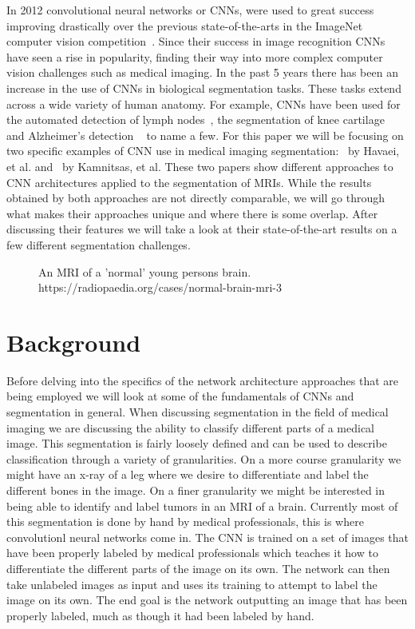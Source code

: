 \documentclass{sig-alternate}
\begin{document}
In 2012 convolutional neural networks or CNNs, were used to great success improving drastically over the previous state-of-the-arts in the ImageNet computer vision competition~\cite{NIPS:2012}. Since their success in image recognition CNNs have seen a rise in popularity, finding their way into more complex computer vision challenges such as medical imaging. In the past 5 years there has been an increase in the use of CNNs in biological segmentation tasks. These tasks extend across a wide variety of human anatomy. For example, CNNs have been used for the automated detection of lymph nodes~\cite{Roth:2014}, the segmentation of knee cartilage~\cite{Prasoon:2013} and Alzheimer's detection ~\cite{Payan:2015} to name a few. For this paper we will be focusing on two specific examples of CNN use in medical imaging segmentation:~\cite{Havaei:2017} by Havaei, et al. and~\cite{Kamnitsas:2017} by Kamnitsas, et al. These two papers show different approaches to CNN architectures applied to the segmentation of MRIs. While the results obtained by both approaches are not directly comparable, we will go through what makes their approaches unique and where there is some overlap. After discussing their features we will take a look at their state-of-the-art results on a few different segmentation challenges.

\begin{figure}
\centering
{}
\caption{An MRI of a 'normal' young persons brain. https://radiopaedia.org/cases/normal-brain-mri-3}
\label{fig:brainMRI}
\end{figure}

\section{Background}
\label{sec:background}

Before delving into the specifics of the network architecture approaches that are being employed we will look at some of the fundamentals of CNNs and segmentation in general. When discussing segmentation in the field of medical imaging we are discussing the ability to classify different parts of a medical image. This segmentation is fairly loosely defined and can be used to describe classification through a variety of granularities. On a more course granularity we might have an x-ray of a leg where we desire to differentiate and label the different bones in the image. On a finer granularity we might be interested in being able to identify and label tumors in an MRI of a brain. Currently most of this segmentation is done by hand by medical professionals, this is where convolutionl neural networks come in. The CNN is trained on a set of images that have been properly labeled by medical professionals which teaches it how to differentiate the different parts of the image on its own. The network can then take unlabeled images as input and uses its training to attempt to label the image on its own. The end goal is the network outputting an image that has been properly labeled, much as though it had been labeled by hand. 
\end{document}
